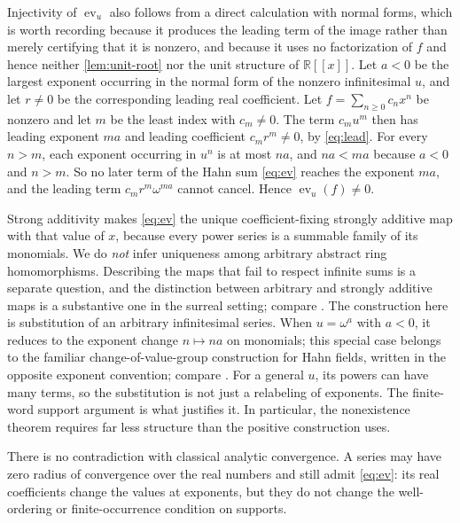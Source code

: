 \documentclass[11pt,letterpaper]{article}
\theoremstyle{definition}
\theoremstyle{remark}
\newenvironment{remark}{\crefalias{theorem}{remark}\remarkx}{\endremarkx}
\newcommand{\R}{\mathbb R}
\newcommand{\ev}{\operatorname{ev}}
\begin{document}
\begin{remark}[Injectivity again, by leading terms]\label{rem:leading-inj}
Injectivity of $\ev_u$ also follows from a direct calculation with normal
forms, which is worth recording because it produces the leading term of the
image rather than merely certifying that it is nonzero, and because it uses
no factorization of $f$ and hence neither \cref{lem:unit-root} nor the unit
structure of $\R[[x]]$. Let $a<0$ be the largest exponent occurring in the
normal form of the nonzero infinitesimal $u$, and let $r\ne0$ be the
corresponding leading real coefficient. Let $f=\sum_{n\ge0}c_nx^n$ be nonzero
and let $m$ be the least index with $c_m\ne0$. The term $c_mu^m$ then has
leading exponent $ma$ and leading coefficient $c_mr^m\ne0$, by
\eqref{eq:lead}. For every $n>m$, each exponent occurring in $u^n$ is at most
$na$, and $na<ma$ because $a<0$ and $n>m$. So no later term of the Hahn sum
\eqref{eq:ev} reaches the exponent $ma$, and the leading term
$c_mr^m\omega^{ma}$ cannot cancel. Hence $\ev_u(f)\ne0$.
\end{remark}

Strong additivity makes \eqref{eq:ev} the unique coefficient-fixing strongly
additive map with that value of $x$, because every power series is a summable
family of its monomials. We do \emph{not} infer uniqueness among arbitrary
abstract ring homomorphisms. Describing the maps that fail to respect infinite
sums is a separate question, and the distinction between arbitrary and
strongly additive maps is a substantive one in the surreal setting; compare
\citep[Sections 3 and 4]{KKS}. The construction here is substitution of an
arbitrary infinitesimal series. When $u=\omega^a$ with $a<0$, it reduces to
the exponent change $n\mapsto na$ on monomials; this special case belongs
to the familiar change-of-value-group construction for Hahn fields, written
in the opposite exponent convention; compare \citep[Section 2.3]{KKS}.
For a general $u$, its powers can have many terms, so the substitution is
not just a relabeling of exponents. The finite-word support argument is what
justifies it. In particular, the nonexistence theorem requires far less
structure than the positive construction uses.

There is no contradiction with classical analytic convergence. A series may
have zero radius of convergence over the real numbers and still admit
\eqref{eq:ev}: its real coefficients change the values at exponents, but they
do not change the well-ordering or finite-occurrence condition on supports.
\end{document}
